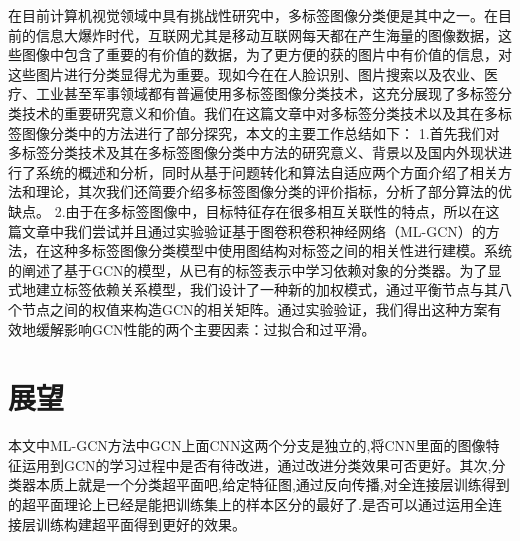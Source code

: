 在目前计算机视觉领域中具有挑战性研究中，多标签图像分类便是其中之一。在目前的信息大爆炸时代，互联网尤其是移动互联网每天都在产生海量的图像数据，这些图像中包含了重要的有价值的数据，为了更方便的获的图片中有价值的信息，对这些图片进行分类显得尤为重要。现如今在在人脸识别、图片搜索以及农业、医疗、工业甚至军事领域都有普遍使用多标签图像分类技术，这充分展现了多标签分类技术的重要研究意义和价值。我们在这篇文章中对多标签分类技术以及其在多标签图像分类中的方法进行了部分探究，本文的主要工作总结如下：
1.首先我们对多标签分类技术及其在多标签图像分类中方法的研究意义、背景以及国内外现状进行了系统的概述和分析，同时从基于问题转化和算法自适应两个方面介绍了相关方法和理论，其次我们还简要介绍多标签图像分类的评价指标，分析了部分算法的优缺点。
2.由于在多标签图像中，目标特征存在很多相互关联性的特点，所以在这篇文章中我们尝试并且通过实验验证基于图卷积卷积神经网络（ML-GCN）的方法，在这种多标签图像分类模型中使用图结构对标签之间的相关性进行建模。系统的阐述了基于GCN的模型，从已有的标签表示中学习依赖对象的分类器。为了显式地建立标签依赖关系模型，我们设计了一种新的加权模式，通过平衡节点与其八个节点之间的权值来构造GCN的相关矩阵。通过实验验证，我们得出这种方案有效地缓解影响GCN性能的两个主要因素：过拟合和过平滑。

\section{展望}
本文中ML-GCN方法中GCN上面CNN这两个分支是独立的,将CNN里面的图像特征运用到GCN的学习过程中是否有待改进，通过改进分类效果可否更好。其次,分类器本质上就是一个分类超平面吧,给定特征图,通过反向传播,对全连接层训练得到的超平面理论上已经是能把训练集上的样本区分的最好了.是否可以通过运用全连接层训练构建超平面得到更好的效果。


